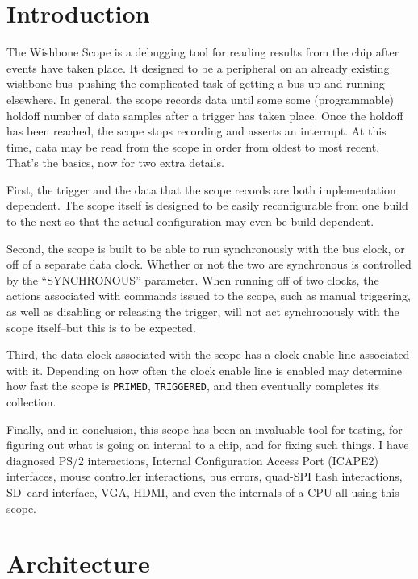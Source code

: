 \documentclass{gqtekspec}
\begin{document}
\chapter{Introduction}
\setcounter{page}{1}

The Wishbone Scope is a debugging tool for reading results from the chip after
events have taken place.  It designed to be a peripheral on an already
existing wishbone bus--pushing the complicated task of getting a bus up
and running elsewhere.  In general, the scope records data until some
some (programmable) holdoff number of data samples after a trigger has taken 
place.  Once the holdoff has been reached, the scope stops recording and 
asserts an interrupt.  At this time, data may be read from the scope in order 
from oldest to most recent.  That's the basics, now for two extra details.
 
First, the trigger and the data that the scope records are both implementation 
dependent.  The scope itself is designed to be easily reconfigurable from one 
build to the next so that the actual configuration may even be build dependent.
 
Second, the scope is built to be able to run synchronously with the bus clock,
or off of a separate data clock.  Whether or not the two are synchronous is
controlled by the ``SYNCHRONOUS'' parameter.  When running off of two
clocks, the actions associated with commands issued to the scope, 
such as manual triggering, as well as disabling or releasing the trigger, will
not act synchronously with the scope itself--but this is to be expected.

Third, the data clock associated with the scope has a clock enable line
associated with it.  Depending on how often the clock enable line is enabled
may determine how fast the scope is {\tt PRIMED}, {\tt TRIGGERED}, and then
eventually completes its collection.

Finally, and in conclusion, this scope has been an invaluable tool for
testing, for figuring out what is going on internal to a chip, and for fixing
such things.  I have diagnosed PS/2 interactions, Internal 
Configuration Access Port (ICAPE2) interfaces, mouse controller interactions,
bus errors, quad-SPI flash interactions, SD--card interface, VGA, HDMI, and
even the internals of a CPU all using this scope.
 
\chapter{Architecture}
\end{document}

